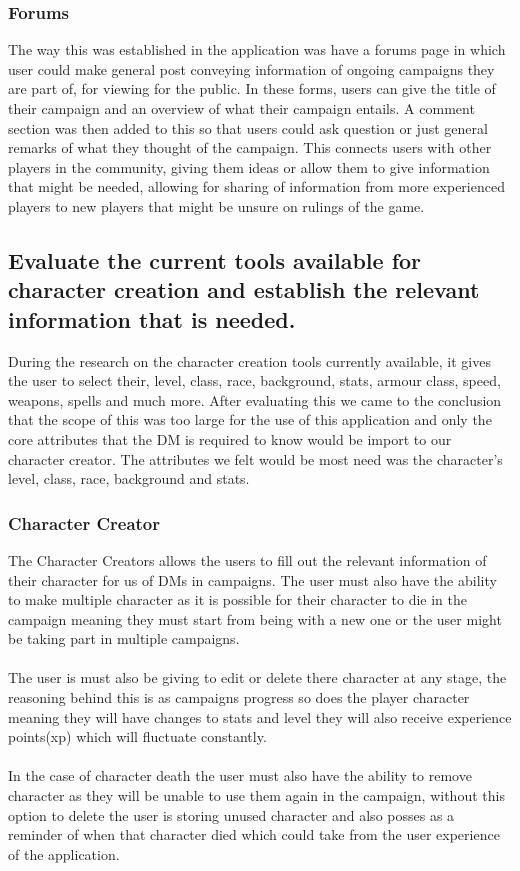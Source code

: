 \subsubsection{Forums}
The way this was established in the application was have a forums page in which user could make general post conveying information of ongoing campaigns they are part of, for viewing for the public.  In these forms, users can give the title of their campaign and an overview of what their campaign entails.  A comment section was then added to this so that users could ask question or just general remarks of what they thought of the campaign.  This connects users with other players in the community, giving them ideas or allow them to give information that might be needed, allowing for sharing of information from more experienced players to new players that might be unsure on rulings of the game.

\subsection{Evaluate the current tools available for character creation and establish the relevant information that is needed.}
During the research on the character creation tools currently available, it gives the user to select their, level, class, race, background, stats, armour class, speed, weapons, spells and much more.  After evaluating this we came to the conclusion that the scope of this was too large for the use of this application and only the core attributes that the DM is required to know would be import to our character creator.  The attributes we felt would be most need was the character's level, class, race, background and stats. \cite{d&dBeyond} \cite{handbook}

\subsubsection{Character Creator}
The Character Creators allows the users to fill out the relevant information of their character for us of DMs in campaigns.  The user must also have the ability to make multiple character as it is possible for their character to die in the campaign meaning they must start from being with a new one or the user might be taking part in multiple campaigns. \\\\
The user is must also be giving to edit or delete there character at any stage, the reasoning behind this is as campaigns progress so does the player character meaning they will have changes to stats and level they will also receive experience points(xp) which will fluctuate constantly. \\\\
In the case of character death the user must also have the ability to remove character as they will be unable to use them again in the campaign, without this option to delete the user is storing unused character and also posses as a reminder of when that character died which could take from the user experience of the application.

